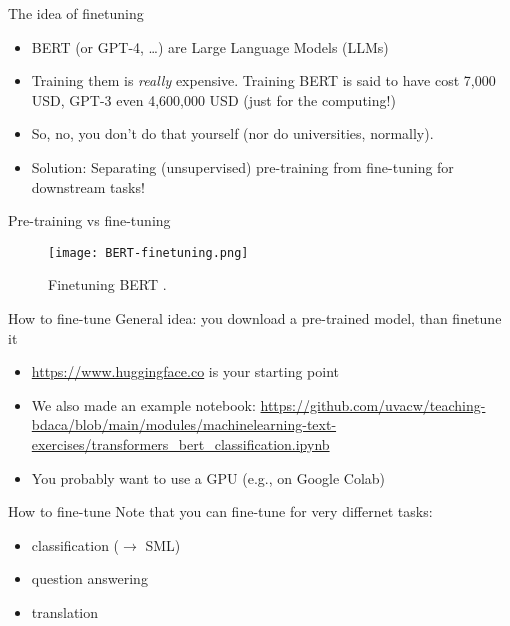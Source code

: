 \begin{frame}{The idea of finetuning}
  \begin{itemize}
  \item BERT (or GPT-4, \ldots) are Large Language Models (LLMs)
  \item Training them is \emph{really} expensive. Training BERT is said to have cost 7,000 USD, GPT-3 even 4,600,000 USD (just for the computing!) 
  \item So, no, you don't do that yourself (nor do universities, normally).
  \item Solution: Separating (unsupervised) pre-training from fine-tuning for downstream tasks!
  \end{itemize}

\end{frame}


\begin{frame}{Pre-training vs fine-tuning}
\begin{figure}
	\centering
	\texttt{[image: BERT-finetuning.png]}
	\caption{Finetuning BERT \parencite{Devlin2018}.}
	\label{fig:finetuning}
\end{figure}

\end{frame}


\begin{frame}{How to fine-tune}
General idea: you download a pre-trained model, than finetune it 
  
  \begin{itemize}
  \item \url{https://www.huggingface.co} is your starting point
  \item We also made an example notebook: \url{https://github.com/uvacw/teaching-bdaca/blob/main/modules/machinelearning-text-exercises/transformers_bert_classification.ipynb}
  \item You probably want to use a GPU (e.g., on Google Colab)
  \end{itemize}

\end{frame}


\begin{frame}{How to fine-tune}
Note that you can fine-tune for very differnet tasks:
  
  \begin{itemize}
  \item classification ($\rightarrow$ SML)
  \item question answering
  \item translation
  \end{itemize}
\end{frame}


